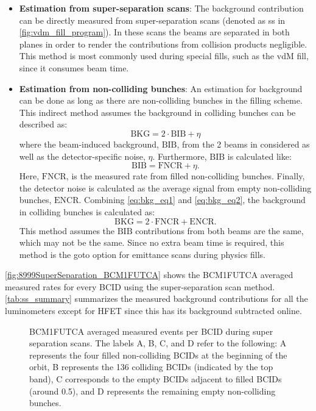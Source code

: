 \begin{itemize}
	\item \textbf{Estimation from super-separation scans}: The background contribution can be directly measured from super-separation scans (denoted as ss in \autoref{fig:vdm_fill_program}). In these scans the beams are separated in both planes in order to render the contributions from collision products negligible. This method is most commonly used during special fills, such as the vdM fill, since it consumes beam time.
	\item \textbf{Estimation from non-colliding bunches}: An estimation for background can be done as long as there are non-colliding bunches in the filling scheme. This indirect method assumes the background in colliding bunches can be described as:
	\begin{equation}
		\label{eq:bkg_eq1}
		\mathrm{BKG} = 2 \cdot \mathrm{BIB} + \eta
	\end{equation}
	where the beam-induced background, $\mathrm{BIB}$, from the 2 beams in considered as well as the detector-specific noise, $\eta$. Furthermore, $\mathrm{BIB}$ is calculated like:
	\begin{equation}
		\label{eq:bkg_eq2}
		\mathrm{BIB} = \mathrm{FNCR} + \eta.
	\end{equation}
	Here, $\mathrm{FNCR}$, is the measured rate from filled non-colliding bunches. Finally, the detector noise is calculated as the average signal from empty non-colliding bunches, $\mathrm{ENCR}$. Combining \autoref{eq:bkg_eq1} and \autoref{eq:bkg_eq2}, the background in colliding bunches is calculated as:
	\begin{equation}
		\mathrm{BKG} = 2 \cdot \mathrm{FNCR} + \mathrm{ENCR}.
	\end{equation}
	This method assumes the $\mathrm{BIB}$ contributions from both beams are the same, which may not be the same. Since no extra beam time is required, this method is the goto option for emittance scans during physics fills.
\end{itemize}

\autoref{fig:8999SuperSeparation_BCM1FUTCA} shows the BCM1FUTCA averaged measured rates for every BCID using the super-separation scan method. \autoref{tab:ss_summary} summarizes the measured background contributions for all the luminometers except for HFET since this has its background subtracted online.

\begin{figure}[!htb]
	\centering
	\caption{BCM1FUTCA averaged measured events per BCID during super separation scans. The labels A, B, C, and D refer to the following: A represents the four filled non-colliding BCIDs at the beginning of the orbit, B represents the 136 colliding BCIDs (indicated by the top band), C corresponds to the empty BCIDs adjacent to filled BCIDs (around 0.5), and D represents the remaining empty non-colliding bunches.}
	\label{fig:8999SuperSeparation_BCM1FUTCA}
\end{figure}


